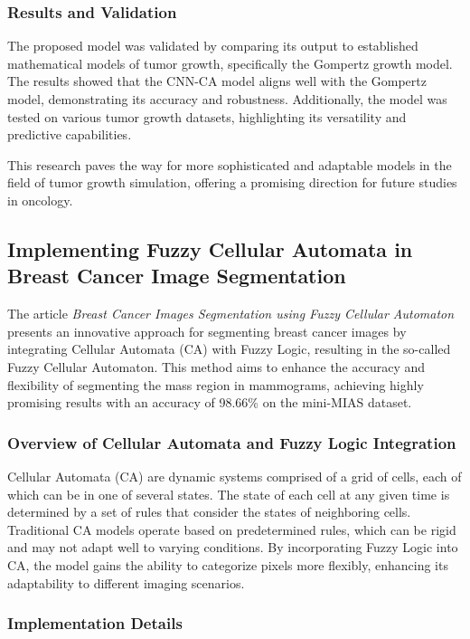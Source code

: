 \documentclass[9pt,a4paper,twoside]{tau-class/tau}
\begin{document}
\subsubsection{Results and Validation}

The proposed model was validated by comparing its output to established mathematical models of tumor growth, specifically the Gompertz growth model. The results showed that the CNN-CA model aligns well with the Gompertz model, demonstrating its accuracy and robustness. Additionally, the model was tested on various tumor growth datasets, highlighting its versatility and predictive capabilities.

This research paves the way for more sophisticated and adaptable models in the field of tumor growth simulation, offering a promising direction for future studies in oncology.

\subsection{Implementing Fuzzy Cellular Automata in Breast Cancer Image Segmentation}

The article \textit{Breast Cancer Images Segmentation using Fuzzy Cellular Automaton} presents an innovative approach for segmenting breast cancer images by integrating Cellular Automata (CA) with Fuzzy Logic, resulting in the so-called Fuzzy Cellular Automaton. This method aims to enhance the accuracy and flexibility of segmenting the mass region in mammograms, achieving highly promising results with an accuracy of 98.66\% on the mini-MIAS dataset.\cite{ION2023999}

\subsubsection{Overview of Cellular Automata and Fuzzy Logic Integration}

Cellular Automata (CA) are dynamic systems comprised of a grid of cells, each of which can be in one of several states. The state of each cell at any given time is determined by a set of rules that consider the states of neighboring cells. Traditional CA models operate based on predetermined rules, which can be rigid and may not adapt well to varying conditions. By incorporating Fuzzy Logic into CA, the model gains the ability to categorize pixels more flexibly, enhancing its adaptability to different imaging scenarios.

\subsubsection{Implementation Details}
\end{document}
